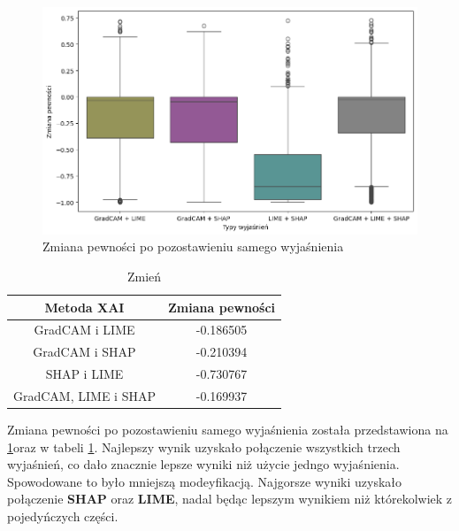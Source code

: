 \begin{figure}[h]
	\centering\includegraphics[width=.9\textwidth]{img/combine_confidence_exp_or}
	\caption{Zmiana pewności po pozostawieniu samego wyjaśnienia}  \label{rys:combineandconfidenceor}
\end{figure}
\begin{table}[h]
	\centering
	\begin{tabular}{|c|c|}
		\hline
		\textbf{Metoda XAI}  & Zmiana pewności \\
		\hline
		GradCAM i LIME       & -0.186505       \\
		\hline
		GradCAM i SHAP       & -0.210394       \\
		\hline
		SHAP i LIME          & -0.730767       \\
		\hline
		GradCAM, LIME i SHAP & -0.169937       \\
		\hline
	\end{tabular}
	\caption{Zmień}
	\label{tab:combineandconfidenceor}
\end{table}
Zmiana pewności po pozostawieniu samego wyjaśnienia została przedstawiona na \ref{rys:combineandconfidenceor}oraz w tabeli \ref{tab:combineandconfidenceor}.
Najlepszy wynik uzyskało połączenie wszystkich trzech wyjaśnień, co dało znacznie lepsze wyniki niż użycie jedngo wyjaśnienia.
Spowodowane to było mniejszą modeyfikacją.
Najgorsze wyniki uzyskało połączenie \textbf{SHAP} oraz \textbf{LIME}, nadal będąc lepszym wynikiem niż którekolwiek z pojedyńczych części.
\vspace{1cm}

